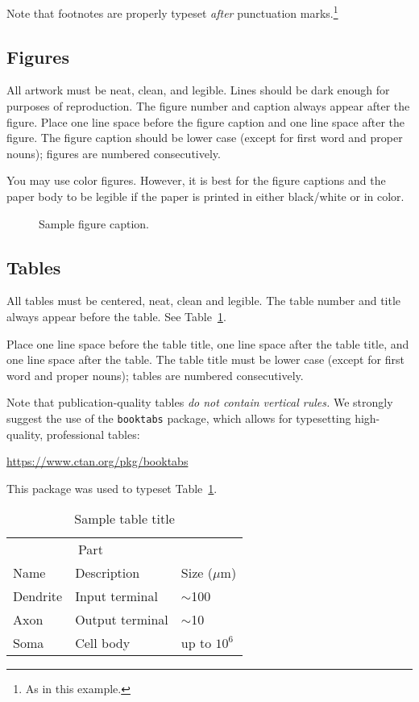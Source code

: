 \documentclass{article}
\begin{document}
Note that footnotes are properly typeset \emph{after} punctuation
marks.\footnote{As in this example.}

\subsection{Figures}

All artwork must be neat, clean, and legible. Lines should be dark
enough for purposes of reproduction. The figure number and caption
always appear after the figure. Place one line space before the figure
caption and one line space after the figure. The figure caption should
be lower case (except for first word and proper nouns); figures are
numbered consecutively.

You may use color figures.  However, it is best for the figure
captions and the paper body to be legible if the paper is printed in
either black/white or in color.
\begin{figure}[h]
  \centering
  \fbox{\rule[-.5cm]{0cm}{4cm} \rule[-.5cm]{4cm}{0cm}}
  \caption{Sample figure caption.}
\end{figure}

\subsection{Tables}

All tables must be centered, neat, clean and legible.  The table
number and title always appear before the table.  See
Table~\ref{sample-table}.

Place one line space before the table title, one line space after the
table title, and one line space after the table. The table title must
be lower case (except for first word and proper nouns); tables are
numbered consecutively.

Note that publication-quality tables \emph{do not contain vertical
  rules.} We strongly suggest the use of the \verb+booktabs+ package,
which allows for typesetting high-quality, professional tables:
\begin{center}
  \url{https://www.ctan.org/pkg/booktabs}
\end{center}
This package was used to typeset Table~\ref{sample-table}.

\begin{table}[t]
  \caption{Sample table title}
  \label{sample-table}
  \centering
  \begin{tabular}{lll}
    \toprule
    \multicolumn{2}{c}{Part}                   \\
    \cmidrule{1-2}
    Name     & Description     & Size ($\mu$m) \\
    \midrule
    Dendrite & Input terminal  & $\sim$100     \\
    Axon     & Output terminal & $\sim$10      \\
    Soma     & Cell body       & up to $10^6$  \\
    \bottomrule
  \end{tabular}
\end{table}
\end{document}
